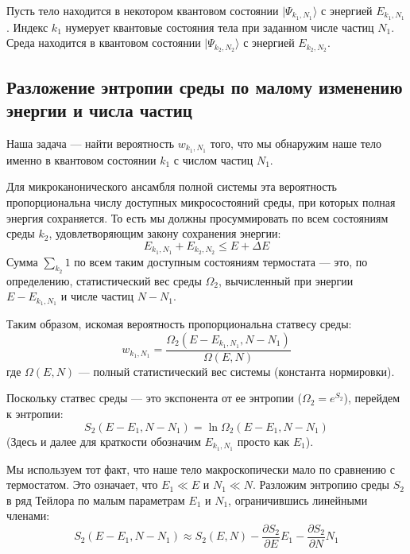 \documentclass[../general/general]{subfiles}
\begin{document}
Пусть тело находится в некотором квантовом состоянии $|\Psi_{k_1, N_1}\rangle$ с энергией $E_{k_1, N_1}$. Индекс $k_1$ нумерует квантовые состояния тела при заданном числе частиц $N_1$. Среда находится в квантовом состоянии $|\Psi_{k_2, N_2}\rangle$ с энергией $E_{k_2, N_2}$. 

\subsection{Разложение энтропии среды по малому изменению энергии и числа частиц}

Наша задача — найти вероятность $w_{k_1, N_1}$ того, что мы обнаружим наше тело именно в квантовом состоянии $k_1$ с числом частиц $N_1$. 

Для микроканонического ансамбля полной системы эта вероятность пропорциональна числу доступных микросостояний среды, при которых полная энергия сохраняется. То есть мы должны просуммировать по всем состояниям среды $k_2$, удовлетворяющим закону сохранения энергии:
\begin{equation*}
    E_{k_1, N_1} + E_{k_2, N_2} \leq E + \Delta E
\end{equation*}
Сумма $\sum_{k_2} 1$ по всем таким доступным состояниям термостата — это, по определению, статистический вес среды $\Omega_2$, вычисленный при энергии $E - E_{k_1, N_1}$ и числе частиц $N - N_1$. 

Таким образом, искомая вероятность пропорциональна статвесу среды:
\begin{equation*}
    w_{k_1, N_1} = \frac{\Omega_2(E - E_{k_1, N_1}, N - N_1)}{\Omega(E, N)}
\end{equation*}
где $\Omega(E, N)$ — полный статистический вес системы (константа нормировки).

Поскольку статвес среды — это экспонента от ее энтропии ($\Omega_2 = e^{S_2}$), перейдем к энтропии:
\begin{equation*}
    S_2(E - E_1, N - N_1) = \ln \Omega_2(E - E_1, N - N_1)
\end{equation*}
(Здесь и далее для краткости обозначим $E_{k_1, N_1}$ просто как $E_1$). 

Мы используем тот факт, что наше тело макроскопически мало по сравнению с термостатом. Это означает, что $E_1 \ll E$ и $N_1 \ll N$. Разложим энтропию среды $S_2$ в ряд Тейлора по малым параметрам $E_1$ и $N_1$, ограничившись линейными членами:
\begin{equation}
    S_2(E - E_1, N - N_1) \approx S_2(E, N) - \frac{\partial S_2}{\partial E} E_1 - \frac{\partial S_2}{\partial N} N_1
\end{equation}
\end{document}
